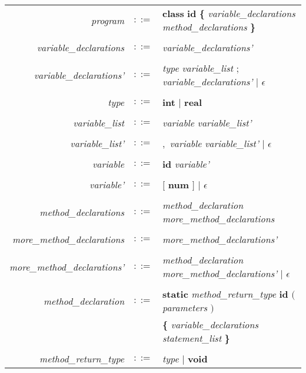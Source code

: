 \documentclass{article}
\begin{document}
\newcommand{\token}[1]
{ \textbf{#1} }

\newcommand{\nont}[1]
{ \emph{#1} }

\newcommand{\lnont}[1]
{ \\
\emph{#1} & $::=$ &
}

\begin{tabular}{r l l}

	\lnont{program} \token{class} \token{id}  \token{\{}  \nont{variable\_declarations} \nont{method\_declarations} \token{\}} \\

	\lnont{variable\_declarations} \nont{variable\_declarations'} \\

	\lnont{variable\_declarations'} \nont{type} \nont{variable\_list} \token{$;$} \nont{variable\_declarations'} $|$ $\epsilon$ \\

	\lnont{type}  \token{int} $|$ \token{real} \\

	\lnont{variable\_list} \nont{variable} \nont{variable\_list'} \\

	\lnont{variable\_list'} \token{$,$} \nont{variable} \nont{variable\_list'} $|$ $\epsilon$ \\

	\lnont{variable} \token{id} \nont{variable'} \\
	\lnont{variable'} \token{$[$} \token{num} \token{$]$} $|$ $\epsilon$ \\

	\lnont{method\_declarations}  \nont{method\_declaration} \nont{more\_method\_declarations} \\

	\lnont{more\_method\_declarations} \nont{more\_method\_declarations'} \\
	\lnont{more\_method\_declarations'} \nont{method\_declaration} \nont{more\_method\_declarations'} $|$ $\epsilon$ \\

	\lnont{method\_declaration} \token{static} \nont{method\_return\_type} \token{id} \token{$($} \nont{parameters} \token{$)$} \\
	& &  \token{\{}  \nont{variable\_declarations} \nont{statement\_list} \token{\}} \\

	\lnont{method\_return\_type} \nont{type} $|$ \token{void} \\


\end{tabular}
\end{document}
